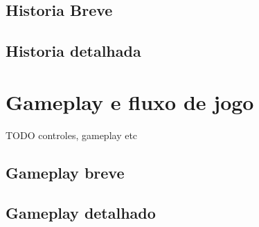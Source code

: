     \subsection{Historia Breve}%
    \subsection{Historia detalhada}%

\section{Gameplay e fluxo de jogo}%
TODO controles, gameplay etc
    \subsection{Gameplay breve}%
    \subsection{Gameplay detalhado}%


